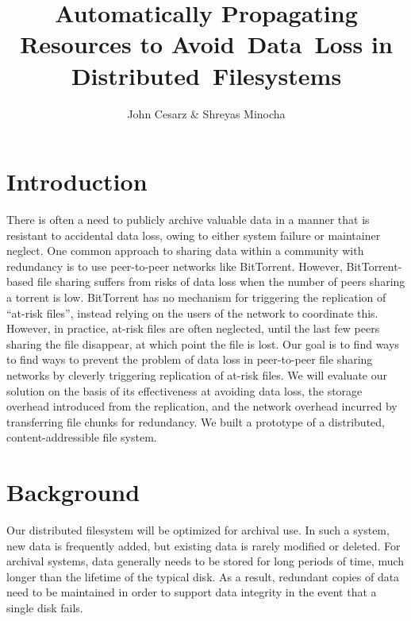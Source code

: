 \documentclass[twocolumn]{article}
\title{Automatically Propagating Resources to Avoid~Data~Loss in Distributed~Filesystems}
\author{John Cesarz \& Shreyas Minocha}
\begin{document}
\maketitle

\section{Introduction}

There is often a need to publicly archive valuable data in a manner that is resistant to accidental data loss, owing to either system failure or maintainer neglect.
%
One common approach to sharing data within a community with redundancy is to use peer-to-peer networks like BitTorrent.
However, BitTorrent-based file sharing suffers from risks of data loss when the number of peers sharing a torrent is low.
BitTorrent has no mechanism for triggering the replication of ``at-risk files'', instead relying on the users of the network to coordinate this.
However, in practice, at-risk files are often neglected, until the last few peers sharing the file disappear, at which point the file is lost.
%
Our goal is to find ways to find ways to prevent the problem of data loss in peer-to-peer file sharing networks by cleverly triggering replication of at-risk files.
%
%
%
We will evaluate our solution on the basis of its effectiveness at avoiding data loss, the storage overhead introduced from the replication, and the network overhead incurred by transferring file chunks for redundancy.
%
We built a prototype of a distributed, content-addressible file system.

\section{Background}


Our distributed filesystem will be optimized for archival use.
In such a system, new data is frequently added, but existing data is rarely modified or deleted.
For archival systems, data generally needs to be stored for long periods of time, much longer than the lifetime of the typical disk.
As a result, redundant copies of data need to be maintained in order to support data integrity in the event that a single disk fails.
\end{document}
